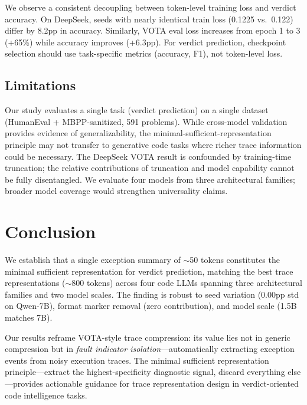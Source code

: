 \documentclass[11pt,a4paper]{article}
\begin{document}
We observe a consistent decoupling between token-level training loss and verdict accuracy.
On DeepSeek, seeds with nearly identical train loss (0.1225 vs.\ 0.122) differ by 8.2pp in accuracy.
Similarly, VOTA eval loss increases from epoch 1 to 3 (+65\%) while accuracy improves (+6.3pp).
For verdict prediction, checkpoint selection should use task-specific metrics (accuracy, F1), not token-level loss.

\subsection{Limitations}

Our study evaluates a single task (verdict prediction) on a single dataset (HumanEval + MBPP-sanitized, 591 problems).
While cross-model validation provides evidence of generalizability, the minimal-sufficient-representation principle may not transfer to generative code tasks where richer trace information could be necessary.
The DeepSeek VOTA result is confounded by training-time truncation; the relative contributions of truncation and model capability cannot be fully disentangled.
We evaluate four models from three architectural families; broader model coverage would strengthen universality claims.

\section{Conclusion}

We establish that a single exception summary of ${\sim}$50 tokens constitutes the minimal sufficient representation for verdict prediction, matching the best trace representations (${\sim}$800 tokens) across four code LLMs spanning three architectural families and two model scales.
The finding is robust to seed variation (0.00pp std on Qwen-7B), format marker removal (zero contribution), and model scale (1.5B matches 7B).

Our results reframe VOTA-style trace compression: its value lies not in generic compression but in \emph{fault indicator isolation}---automatically extracting exception events from noisy execution traces.
The minimal sufficient representation principle---extract the highest-specificity diagnostic signal, discard everything else---provides actionable guidance for trace representation design in verdict-oriented code intelligence tasks.
\end{document}
